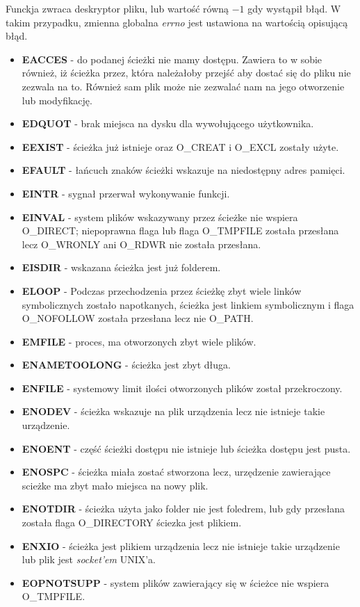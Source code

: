 \documentclass{article}
\begin{document}
Funckja zwraca deskryptor pliku, lub wartość równą $-1$ gdy wystąpił błąd.
W takim przypadku, zmienna globalna \textit{errno} jest ustawiona na wartością opisującą błąd.
\begin{itemize}
\item \textbf{EACCES} - do podanej ścieżki nie mamy dostępu. Zawiera to w sobie również,
iż ścieżka przez, która należałoby przejść aby dostać się do pliku nie zezwala na to.
Również sam plik może nie zezwalać nam na jego otworzenie lub modyfikację.
\item \textbf{EDQUOT} - brak miejsca na dysku dla wywołującego użytkownika.
\item \textbf{EEXIST} - ścieżka już istnieje oraz O\_CREAT i O\_EXCL zostały użyte.
\item \textbf{EFAULT} - łańcuch znaków ścieżki wskazuje na niedostępny adres pamięci.
\item \textbf{EINTR} - sygnał przerwał wykonywanie funkcji.
\item \textbf{EINVAL} - system plików wskazywany przez ścieżke nie wspiera O\_DIRECT;
	niepoprawna flaga lub flaga O\_TMPFILE została przesłana lecz O\_WRONLY ani
	O\_RDWR nie została przesłana.
\item \textbf{EISDIR} - wskazana ścieżka jest już folderem.
\item \textbf{ELOOP} - Podczas przechodzenia przez ścieżkę zbyt wiele linków symbolicznych zostało napotkanych, ścieżka jest linkiem symbolicznym i flaga O\_NOFOLLOW została przesłana
	lecz nie O\_PATH.
\item \textbf{EMFILE} - proces, ma otworzonych zbyt wiele plików.
\item \textbf{ENAMETOOLONG} - ścieżka jest zbyt długa.
\item \textbf{ENFILE} - systemowy limit ilości otworzonych plików został przekroczony.
\item \textbf{ENODEV} - ścieżka wskazuje na plik urządzenia lecz nie istnieje takie urządzenie.
\item \textbf{ENOENT} - część ścieżki dostępu nie istnieje lub ścieżka dostępu jest pusta.
\item \textbf{ENOSPC} - ścieżka miała zostać stworzona lecz, urzędzenie zawierające scieżke ma zbyt mało miejsca na nowy plik.
\item \textbf{ENOTDIR} - ścieżka użyta jako folder nie jest foledrem, lub gdy przesłana została flaga O\_DIRECTORY ściezka jest plikiem.
\item \textbf{ENXIO} - ścieżka jest plikiem urządzenia lecz nie istnieje takie urządzenie lub plik jest \textit{socket'em} UNIX'a.
\item \textbf{EOPNOTSUPP} - system plików zawierający się w ścieżce nie wspiera O\_TMPFILE.
\end{itemize}
\end{document}
